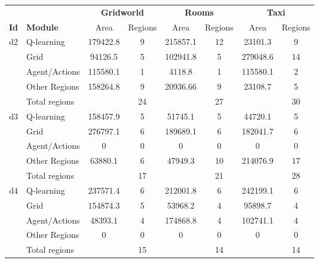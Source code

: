 \begin{tabular}{ c l | cc | cc | cc }

\toprule
& & \multicolumn{2}{c|}{\textbf{Gridworld}} & \multicolumn{2}{c|}{\textbf{Rooms}} & \multicolumn{2}{c}{\textbf{Taxi}} \\
\textbf{Id} & \textbf{Module} & 
Area & Regions &
Area & Regions &
Area & Regions \\ 
 
\midrule

\multirow{5}{*}{d2} & Q-learning 	& 179422.8&9 	&215857.1&12 	&23101.3&9\\
& Grid 					& 94126.5&5 	&102941.8&5 	&279048.6&14 \\
& Agent/Actions 				& 115580.1&1 	&4118.8&1 		&115580.1&2\\
& Other Regions	 			& 158264.8&9 	&20936.66&9 	&23108.7&5\\
& Total regions 				& &24 		&&27 			&&30\\

\midrule
\multirow{5}{*}{d3} & Q-learning 	& 158457.9&5 	&51745.1&5 		&44720.1&5\\
& Grid 					& 276797.1&6   	&189689.1&6 	&182041.7&6 \\
& Agent/Actions 				& 0&0 		&0&0 			&0&0\\
& Other Regions	 			& 63880.1&6 	&47949.3&10 	&214076.9&17\\
& Total regions 				& &17 		&&21 			&&28\\

\midrule
\multirow{5}{*}{d4} & Q-learning 	& 237571.4&6 	&212001.8&6 	&242199.1&6\\
& Grid 					& 154874.3&5 	&53968.2&4 		&95898.7&4 \\
& Agent/Actions 				& 48393.1&4 	&174868.8&4 	&102741.1&4\\
& Other Regions	 			& 0&0 		&0&0 			&0&0\\
& Total regions 				& &15 		&&14 			&&14\\


\end{tabular}
